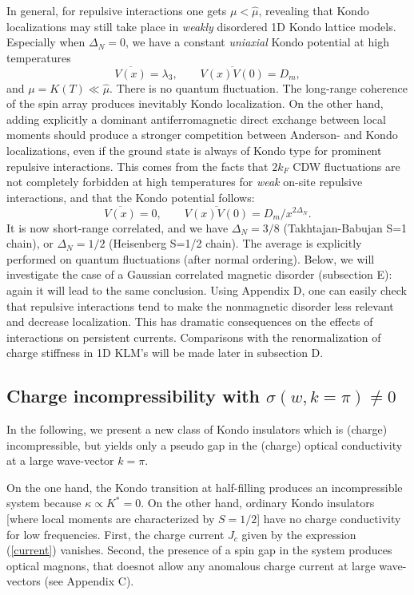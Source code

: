 In general, for repulsive interactions one gets 
$\mu<\hat{\mu}$, revealing that 
Kondo localizations may still take place in {\it weakly} disordered 
1D Kondo lattice models. Especially when $\Delta_N=0$, we
have a constant {\it uniaxial} Kondo potential at high temperatures
\begin{equation}
\overline{V(x)}=\lambda_3,\qquad \overline{V(x)V(0)}=D_m,
\end{equation}
and $\mu=K(T)\ll\hat{\mu}$. There is no
quantum fluctuation.
The long-range coherence of the spin array
produces inevitably Kondo localization.
On the other hand, adding explicitly a 
dominant antiferromagnetic direct exchange between local moments
should produce a stronger
competition between Anderson- and Kondo localizations, even if
the ground state is always of Kondo type for prominent 
repulsive interactions\cite{Karyn1}. 
This comes from the facts that 
$2k_F$ CDW fluctuations are not
completely forbidden at high temperatures
for {\it weak} on-site repulsive interactions, and 
that the Kondo potential follows:
\begin{equation}
\overline{V(x)}=0,\qquad \overline{V(x)V(0)}=D_m/x^{2\Delta_N}.
\end{equation}
It is now short-range correlated, and we have
$\Delta_N=3/8$ (Takhtajan-Babujan S=1 chain), or $\Delta_N=1/2$ (Heisenberg
S=1/2 chain). The average is explicitly
performed on quantum fluctuations (after normal ordering).
\vskip 0.1cm
Below, we will 
investigate the case of a Gaussian
correlated magnetic disorder (subsection E): 
again it will lead to the same conclusion.
Using Appendix D, one can easily
check that repulsive interactions tend to make the nonmagnetic disorder less
relevant and decrease localization. This has dramatic consequences
on the effects of interactions on persistent currents\cite{Giam-Shastry}. 
Comparisons with the renormalization of charge stiffness in 1D
KLM's  will be made later in subsection D.

\subsection{Charge incompressibility with $\sigma(w,k=\pi)\neq 0$}

In the following, we present a new class of Kondo insulators 
which
is (charge) incompressible, but yields only a pseudo gap in the 
(charge) optical conductivity at a large wave-vector $k=\pi$.

On the one hand, the Kondo transition at 
half-filling produces an incompressible system because $\kappa\propto K^*=0$.
On the other hand, ordinary Kondo insulators [where
local moments are characterized by $S=1/2$] have
no charge conductivity for low frequencies. First, 
the charge current $J_c$ given by the expression
(\ref{current}) vanishes. 
Second, the presence of a spin gap in the system produces
optical magnons, that doesnot allow any anomalous charge current at
large wave-vectors (see Appendix C). 

